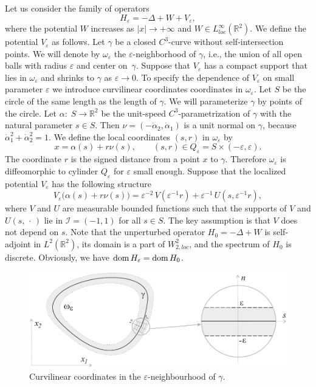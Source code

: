 \documentclass[reqno]{amsart}
\theoremstyle{plain}
\numberwithin{equation}{section}
\newcommand{\dom}{\mathop{\rm dom}}
\newcommand{\Real}{\mathbb R}
\newcommand{\eps}{\varepsilon}
\newcommand{\cI}{\mathcal{I}}
\begin{document}
Let us consider the family of operators
\begin{equation}\label{OprHe}
H_\eps=-\Delta +W+V_\eps,
\end{equation}
where the potential $W$ increases as $|x|\to +\infty$ and $W\in L^\infty_{loc}(\Real^2)$. We define the potential $V_\eps$ as follows.
Let $\gamma$ be a  closed $C^3$-curve without self-intersection
points. We will denote by $\omega_\eps$ the $\eps$-neighborhood of $\gamma$, i.e., the union of all open balls with radius $\eps$ and center on~$\gamma$.  Suppose that $V_\eps$ has a compact support that lies  in $\omega_\eps$ and  shrinks to $\gamma$ as $\eps\to 0$. To specify  the dependence of $V_\eps$ on  small parameter $\eps$ we introduce  curvilinear coordinates coordinates in $\omega_\eps$. Let $S$ be the circle of the same length as the length of $\gamma$. We will parameterize $\gamma$ by points of the circle.
Let $\alpha\colon\; S\to \Real^2$ be the unit-speed $C^3$-parametrization of $\gamma$ with the natural parameter $s\in S$.
Then $\nu=(-\dot{\alpha}_2, \dot{\alpha}_1)$ is a unit normal on $\gamma$, because  $\dot{\alpha}_1^2+\dot{\alpha}_2^2=1$.
We define the local coordinates $(s,r)$ in $\omega_\eps$ by
\begin{equation}\label{LocalTr}
    x=\alpha(s)+r\nu(s), \qquad (s,r)\in Q_\eps=S\times (-\eps, \eps).
\end{equation}
The coordinate $r$ is the signed distance from a point $x$ to $\gamma$.
Therefore  $\omega_\eps$ is diffeomorphic to cylinder $Q_\eps$ for $\eps$ small enough. Suppose that the localized potential $V_\eps$ has the following structure
\begin{equation}\label{Veps}
V_\eps\big(\alpha(s)+r\nu(s)\big)=\eps^{-2}\,V\left(\eps^{-1}r\right)
+\eps^{-1}\,U\left(s,\eps^{-1}r\right),
\end{equation}
where $V$ and $U$ are measurable bounded functions such that the supports
of $V$ and $U(s,\,\cdot\,)$ lie in $\cI=(-1,1)$ for all $s\in S$.
The key assumption is that $V$ does not depend on  $s$.
Note that the unperturbed operator $H_0=-\Delta +W$ is self-adjoint in $L^2(\Real^2)$, its domain is a part of $W_{2,loc}^2$,  and the spectrum of $H_0$ is discrete.  Obviously, we have $\dom H_\eps=\dom H_0$.

\begin{figure}[b]
\centering
\includegraphics[scale=.6]{LocalCoords}
\caption{Curvilinear coordinates in the $\eps$-neighbourhood of $\gamma$.}
\label{FigLocalCoords}
\end{figure}
\end{document}
